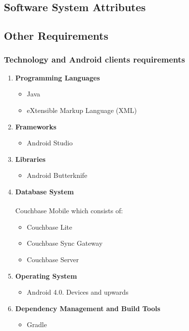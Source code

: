 \documentclass[a4paper,10pt]{article}
\begin{document}
	\subsection{Software System Attributes}
	\subsection{Other Requirements}
	\subsubsection{Technology and Android clients requirements}
\begin{enumerate}
 \item \textbf{Programming Languages}
	\begin{itemize}
		\item Java
		\item eXtensible Markup Language (XML)
	\end{itemize}
\item \textbf{Frameworks}
	\begin{itemize}
		\item Android Studio
	\end{itemize}
\item \textbf{Libraries}
	\begin{itemize}
		\item Android Butterknife
	\end{itemize}
\item \textbf{Database System} \\ \\ 
Couchbase Mobile which consists of:
	\begin{itemize}
 		\item Couchbase Lite
		\item Couchbase Sync Gateway
		\item Couchbase Server
	\end{itemize}
\item \textbf{Operating System}
	\begin{itemize}
 		\item Android 4.0. Devices and upwards
	\end{itemize}
\item \textbf{Dependency Management and Build Tools}
	\begin{itemize}
		\item Gradle
	\end{itemize}
\end{enumerate}
\end{document}
